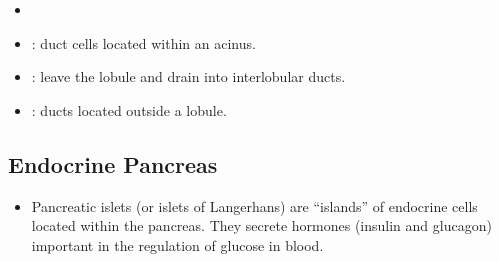 \begin{itemize}
\begin{multicols}{2}
\begin{itemize}
    \begin{center}
    \end{center}
    
    \item {}
    
    \begin{center}
    \end{center}
    
    \item {}: duct cells located within an acinus.
    
    \begin{center}
    \end{center}
    
    \item {}: leave the lobule and drain into interlobular ducts.
    
    \begin{center}
    \end{center}

    \item {}: ducts located outside a lobule. 
    
    \begin{center}
    \end{center}
  \end{itemize}
  \end{multicols}

  \subsection{Endocrine Pancreas}\label{Endocrine Pancreas}
  \begin{itemize}
    \item Pancreatic islets (or islets of Langerhans) are ``islands'' of endocrine cells located within the pancreas. They secrete hormones (insulin and glucagon) important in the regulation of glucose in blood.
  \end{itemize}

  \begin{center}
  \end{center}


\end{itemize}
